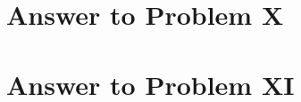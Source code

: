 \documentclass[11pt,a4paper]{article}
\begin{document}
\clearpage
\section{Answer to Problem X}\label{sec:P10}



\clearpage
\section{Answer to Problem XI}\label{sec:P11}



\clearpage

\printbibliography

\end{document}
